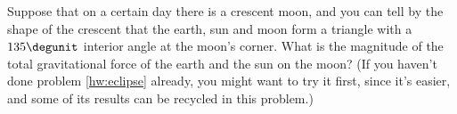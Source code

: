 Suppose that on a certain day there is a crescent moon,
and you can tell by the shape of the crescent that the
earth, sun and moon form a triangle with a $135\degunit$ interior
angle at the moon's corner. What is the magnitude of the
total gravitational force of the earth and the sun on the moon?
(If you haven't done problem \ref{hw:eclipse} already, you might
want to try it first, since it's easier, and some of its results
can be recycled in this problem.)
\answercheck
